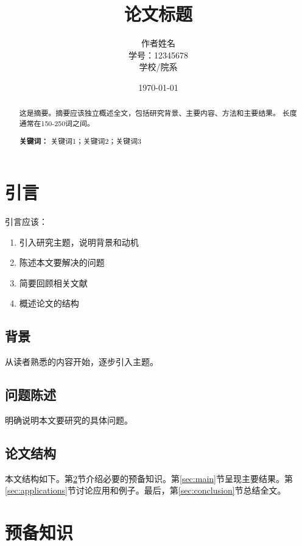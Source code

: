 \documentclass[12pt,a4paper]{article}
\title{\textbf{论文标题}}
\author{作者姓名 \\ 学号：12345678 \\ 学校/院系}
\date{\today}
\theoremstyle{definition}
\begin{document}
\maketitle

\begin{abstract}
这是摘要。摘要应该独立概述全文，包括研究背景、主要内容、方法和主要结果。
长度通常在150-250词之间。

\vspace{1em}
\noindent\textbf{关键词：} 关键词1；关键词2；关键词3
\end{abstract}

\section{引言}

引言应该：
\begin{enumerate}
    \item 引入研究主题，说明背景和动机
    \item 陈述本文要解决的问题
    \item 简要回顾相关文献
    \item 概述论文的结构
\end{enumerate}

\subsection{背景}

从读者熟悉的内容开始，逐步引入主题。

\subsection{问题陈述}

明确说明本文要研究的具体问题。

\subsection{论文结构}

本文结构如下。第\ref{sec:prelim}节介绍必要的预备知识。第\ref{sec:main}节呈现主要结果。第\ref{sec:applications}节讨论应用和例子。最后，第\ref{sec:conclusion}节总结全文。

\section{预备知识}\label{sec:prelim}
\end{document}
